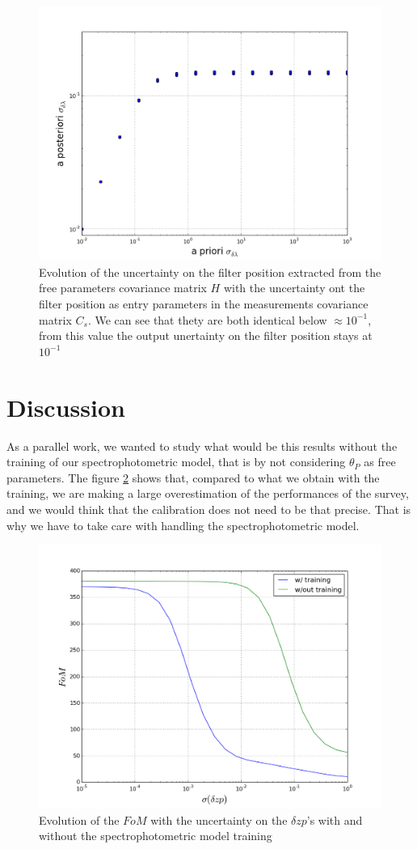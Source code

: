 \documentclass[\docopts]{\docclass}
\begin{document}
\begin{figure}[ht]
  \centering
  \includegraphics[width=0.7\linewidth]{a_posteriori_sigmas.png}
  \caption{Evolution of the uncertainty on the filter position extracted from the free parameters covariance matrix $H$ with the uncertainty ont the filter position as entry parameters in the measurements covariance matrix $C_s$. We can see that thety are both identical below $\approx 10^{-1}$, from this value the output unertainty on the filter position stays at $10^{-1}$}
  \label{fig:delta_lambda_ev}
\end{figure}


\section{Discussion}
\label{sec::discussion}
As a parallel work, we wanted to study what would be this results without the training of our spectrophotometric model, that is by not considering $\theta_P$ as free parameters.
The figure \ref{fig:fom_wout_training} shows that, compared to what we obtain with the training, we are making a large overestimation of the performances of the survey, and we would think that the calibration does not need to be that precise. That is why we have to take care with handling the spectrophotometric model.
\begin{figure}[ht]
  \centering
  \includegraphics[width=0.7\linewidth]{FoM_20k+training.png}
  \caption{Evolution of the $FoM$ with the uncertainty on the $\delta zp$'s with and without the spectrophotometric model training}
  \label{fig:fom_wout_training}
\end{figure}
\end{document}
